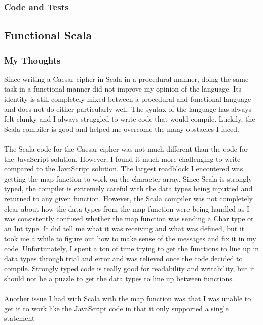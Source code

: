 \documentclass[letterpaper, 10pt, DIV=13]{scrartcl}
\numberwithin{equation}{section}
\numberwithin{figure}{section}
\numberwithin{table}{section}
\begin{document}
\subsubsection{Code and Tests}



\subsection{Functional Scala}
\subsubsection{My Thoughts}
Since writing a Caesar cipher in Scala in a procedural manner, doing the same task in a functional manner did not improve my opinion of the language.
Its identity is still completely mixed between a procedural and functional language and does not do either particularly well. The syntax of the language
has always felt clunky and I always struggled to write code that would compile. Luckily, the Scala compiler is good and helped me overcome
the many obstacles I faced.
\\ \\
The Scala code for the Caesar cipher was not much different than the code for the JavaScript solution. However, I found it much more challenging to write
compared to the JavaScript solution. The largest roadblock I encontered was getting the map function to work on the character array. Since Scala is strongly
typed, the compiler is extremely careful with the data types being inputted and returned to any given function. However, the Scala compiler was not completely
clear about how the data types from the map function were being handled as I was consistently confused whether the map function was sending a Char type or an Int
type. It did tell me what it was receiving and what was defined, but it took me a while to figure out how to make sense of the messages and fix it in my code.
Unfortunately, I spent a ton of time trying to get the functions to line up in data types through trial and error and was relieved once the code decided to
compile. Strongly typed code is really good for readability and writability, but it should not be a puzzle to get the data types to line up between functions.
\\ \\
Another issue I had with Scala with the map function was that I was unable to get it to work like the JavaScript code in that it only supported a single statement
\end{document}
